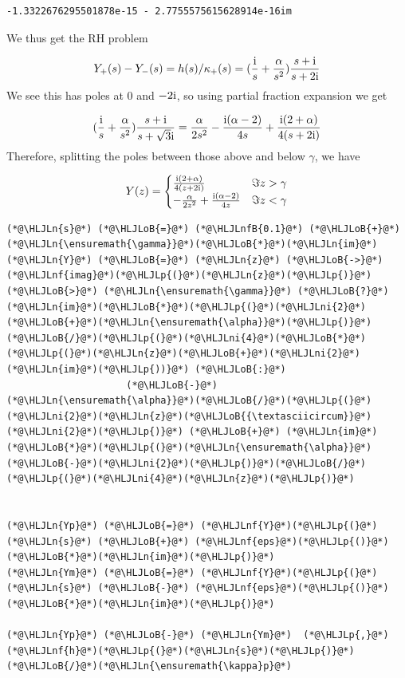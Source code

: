 \documentclass[12pt,a4paper]{article}
\newcommand{\HLJLn}[1]{#1}
\newcommand{\HLJLnf}[1]{\textcolor[RGB]{66,102,213}{#1}}
\newcommand{\HLJLnfB}[1]{\textcolor[RGB]{59,151,46}{#1}}
\newcommand{\HLJLni}[1]{\textcolor[RGB]{59,151,46}{#1}}
\newcommand{\HLJLoB}[1]{\textcolor[RGB]{102,102,102}{\textbf{#1}}}
\newcommand{\HLJLp}[1]{#1}
\def\I{ {\rm i} }
\begin{document}
\begin{lstlisting}
-1.3322676295501878e-15 - 2.7755575615628914e-16im
\end{lstlisting}


We thus get the RH problem

\[
Y_+(s) - Y_-(s) = h(s)/\kappa_+(s) =  ({\I \over s} + {\alpha \over s^2})  {s + \I  \over s + 2 \I}
\]
We see this has poles at $0$ and $-2 \I$, so using partial fraction expansion we get

\[
({\I \over s} + {\alpha \over s^2})  {s + \I  \over s + \sqrt{3} \I} = 
{\alpha \over 2 s^2}- {\I (\alpha-2) \over 4 s}  +{\I (2+\alpha) \over 4 (s+2 \I)}
\]
Therefore, splitting the poles between those above and below $\gamma$, we have

\[
Y(z) = \begin{cases} 
 {\I (2+\alpha) \over 4 (z+2 \I)} & \Im z > \gamma \\
-{\alpha \over 2 z^2}+{\I (\alpha-2) \over 4 z} & \Im z < \gamma
\end{cases}
\]

\begin{lstlisting}
(*@\HLJLn{s}@*) (*@\HLJLoB{=}@*) (*@\HLJLnfB{0.1}@*) (*@\HLJLoB{+}@*) (*@\HLJLn{\ensuremath{\gamma}}@*)(*@\HLJLoB{*}@*)(*@\HLJLn{im}@*) 
(*@\HLJLn{Y}@*) (*@\HLJLoB{=}@*) (*@\HLJLn{z}@*) (*@\HLJLoB{->}@*) (*@\HLJLnf{imag}@*)(*@\HLJLp{(}@*)(*@\HLJLn{z}@*)(*@\HLJLp{)}@*) (*@\HLJLoB{>}@*) (*@\HLJLn{\ensuremath{\gamma}}@*) (*@\HLJLoB{?}@*) (*@\HLJLn{im}@*)(*@\HLJLoB{*}@*)(*@\HLJLp{(}@*)(*@\HLJLni{2}@*)(*@\HLJLoB{+}@*)(*@\HLJLn{\ensuremath{\alpha}}@*)(*@\HLJLp{)}@*)(*@\HLJLoB{/}@*)(*@\HLJLp{(}@*)(*@\HLJLni{4}@*)(*@\HLJLoB{*}@*)(*@\HLJLp{(}@*)(*@\HLJLn{z}@*)(*@\HLJLoB{+}@*)(*@\HLJLni{2}@*)(*@\HLJLn{im}@*)(*@\HLJLp{))}@*) (*@\HLJLoB{:}@*)
                     (*@\HLJLoB{-}@*) (*@\HLJLn{\ensuremath{\alpha}}@*)(*@\HLJLoB{/}@*)(*@\HLJLp{(}@*)(*@\HLJLni{2}@*)(*@\HLJLn{z}@*)(*@\HLJLoB{{\textasciicircum}}@*)(*@\HLJLni{2}@*)(*@\HLJLp{)}@*) (*@\HLJLoB{+}@*) (*@\HLJLn{im}@*)(*@\HLJLoB{*}@*)(*@\HLJLp{(}@*)(*@\HLJLn{\ensuremath{\alpha}}@*)(*@\HLJLoB{-}@*)(*@\HLJLni{2}@*)(*@\HLJLp{)}@*)(*@\HLJLoB{/}@*)(*@\HLJLp{(}@*)(*@\HLJLni{4}@*)(*@\HLJLn{z}@*)(*@\HLJLp{)}@*)


(*@\HLJLn{Yp}@*) (*@\HLJLoB{=}@*) (*@\HLJLnf{Y}@*)(*@\HLJLp{(}@*)(*@\HLJLn{s}@*) (*@\HLJLoB{+}@*) (*@\HLJLnf{eps}@*)(*@\HLJLp{()}@*)(*@\HLJLoB{*}@*)(*@\HLJLn{im}@*)(*@\HLJLp{)}@*)
(*@\HLJLn{Ym}@*) (*@\HLJLoB{=}@*) (*@\HLJLnf{Y}@*)(*@\HLJLp{(}@*)(*@\HLJLn{s}@*) (*@\HLJLoB{-}@*) (*@\HLJLnf{eps}@*)(*@\HLJLp{()}@*)(*@\HLJLoB{*}@*)(*@\HLJLn{im}@*)(*@\HLJLp{)}@*)

(*@\HLJLn{Yp}@*) (*@\HLJLoB{-}@*) (*@\HLJLn{Ym}@*)  (*@\HLJLp{,}@*) (*@\HLJLnf{h}@*)(*@\HLJLp{(}@*)(*@\HLJLn{s}@*)(*@\HLJLp{)}@*)(*@\HLJLoB{/}@*)(*@\HLJLn{\ensuremath{\kappa}p}@*)
\end{lstlisting}
\end{document}

